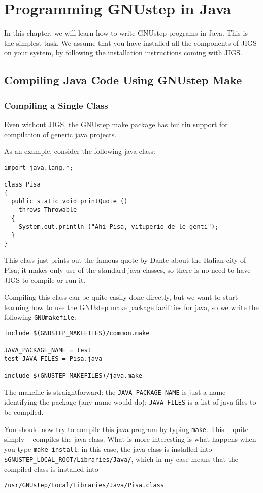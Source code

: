 \chapter{Programming GNUstep in Java}

In this chapter, we will learn how to write GNUstep programs in Java.
This is the simplest task.  We assume that you have installed all the
components of JIGS on your system, by following the installation
instructions coming with JIGS.

\section{Compiling Java Code Using GNUstep Make}

\subsection{Compiling a Single Class}

Even without JIGS, the GNUstep make package has builtin support for
compilation of generic java projects.

As an example, consider the following java class: 
\begin{verbatim}
import java.lang.*;

class Pisa
{ 
  public static void printQuote ()
    throws Throwable
  {
    System.out.println ("Ahi Pisa, vituperio de le genti");
  }
}
\end{verbatim}
This class just prints out the famous quote by Dante about the Italian
city of Pisa; it makes only use of the standard java classes, so there
is no need to have JIGS to compile or run it.

Compiling this class can be quite easily done directly, but we want to
start learning how to use the GNUstep make package facilities for
java, so we write the following \texttt{GNUmakefile}:
\begin{verbatim}
include $(GNUSTEP_MAKEFILES)/common.make

JAVA_PACKAGE_NAME = test
test_JAVA_FILES = Pisa.java

include $(GNUSTEP_MAKEFILES)/java.make
\end{verbatim}
The makefile is straightforward: the \texttt{JAVA\_PACKAGE\_NAME} is
just a name identifying the package (any name would do);
\texttt{JAVA\_FILES} is a list of java files to be compiled.

You should now try to compile this java program by typing
\texttt{make}.  This -- quite simply -- compiles the java class.
What is more interesting is what happens when you type \texttt{make
install}: in this case, the java class is installed into
\texttt{\$GNUSTEP\_LOCAL\_ROOT/Libraries/Java/}, which in my case means 
that the compiled class is installed into
\begin{verbatim}
/usr/GNUstep/Local/Libraries/Java/Pisa.class
\end{verbatim}

